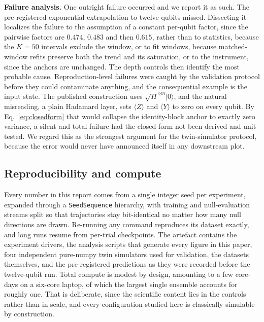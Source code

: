 \documentclass[conference]{IEEEtran}%
\begin{document}
\textbf{Failure analysis.} One outright failure occurred and we report it as such. The pre-registered exponential extrapolation to twelve qubits missed. Dissecting it localizes the failure to the assumption of a constant per-qubit factor, since the pairwise factors are $0.474$, $0.483$ and then $0.615$, rather than to statistics, because the $K{=}50$ intervals exclude the window, or to fit windows, because matched-window refits preserve both the trend and its saturation, or to the instrument, since the anchors are unchanged. The depth controls then identify the most probable cause. Reproduction-level failures were caught by the validation protocol before they could contaminate anything, and the consequential example is the input state. The published construction uses $\sqrt{H}^{\otimes n}\lvert0\rangle$, and the natural misreading, a plain Hadamard layer, sets $\langle Z\rangle$ and $\langle Y\rangle$ to zero on every qubit. By Eq.~\eqref{eq:closedform} that would collapse the identity-block anchor to exactly zero variance, a silent and total failure had the closed form not been derived and unit-tested. We regard this as the strongest argument for the twin-simulator protocol, because the error would never have announced itself in any downstream plot.

\subsection{Reproducibility and compute}
Every number in this report comes from a single integer seed per experiment, expanded through a \texttt{SeedSequence} hierarchy, with training and null-evaluation streams split so that trajectories stay bit-identical no matter how many null directions are drawn. Re-running any command reproduces its dataset exactly, and long runs resume from per-trial checkpoints. The artefact contains the experiment drivers, the analysis scripts that generate every figure in this paper, four independent pure-numpy twin simulators used for validation, the datasets themselves, and the pre-registered predictions as they were recorded before the twelve-qubit run. Total compute is modest by design, amounting to a few core-days on a six-core laptop, of which the largest single ensemble accounts for roughly one. That is deliberate, since the scientific content lies in the controls rather than in scale, and every configuration studied here is classically simulable by construction.
\end{document}

